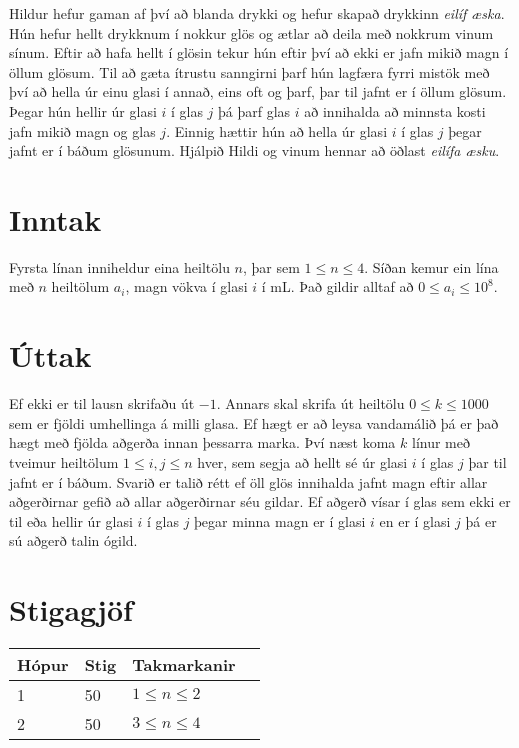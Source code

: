 Hildur hefur gaman af því að blanda drykki og hefur skapað drykkinn \textit{eilíf æska}.
Hún hefur hellt drykknum í nokkur glös og ætlar að deila með nokkrum vinum sínum.
Eftir að hafa hellt í glösin tekur hún eftir því að ekki er jafn mikið magn í öllum glösum.
Til að gæta ítrustu sanngirni þarf hún lagfæra fyrri mistök með því að hella úr einu glasi í annað, eins oft og þarf, þar til jafnt er í öllum glösum.
Þegar hún hellir úr glasi $i$ í glas $j$ þá þarf glas $i$ að innihalda að minnsta kosti jafn mikið magn og glas $j$. Einnig hættir hún að hella úr glasi $i$ í glas $j$ þegar jafnt er í báðum glösunum.
Hjálpið Hildi og vinum hennar að öðlast \textit{eilífa æsku}.

\section*{Inntak}
Fyrsta línan inniheldur eina heiltölu $n$, þar sem $1\leq n\leq 4$.
Síðan kemur ein lína með $n$ heiltölum $a_i$, magn vökva í glasi $i$ í mL. Það gildir alltaf að $0 \leq a_i \leq 10^8$.

\section*{Úttak}
Ef ekki er til lausn skrifaðu út $-1$.
Annars skal skrifa út heiltölu $0 \leq k \leq 1000$ sem er fjöldi umhellinga á milli glasa.
Ef hægt er að leysa vandamálið þá er það hægt með fjölda aðgerða innan þessarra marka.
Því næst koma $k$ línur með tveimur heiltölum $1 \leq i,j \leq n$ hver, sem segja að hellt sé úr glasi $i$ í glas $j$ þar til jafnt er í báðum.
Svarið er talið rétt ef öll glös innihalda jafnt magn eftir allar aðgerðirnar gefið að allar aðgerðirnar séu gildar.
Ef aðgerð vísar í glas sem ekki er til eða hellir úr glasi $i$ í glas $j$ þegar minna magn er í glasi $i$ en er í glasi $j$ þá er sú aðgerð talin ógild.

\section*{Stigagjöf}
\begin{tabular}{|l|l|l|l|}
\hline
Hópur & Stig & Takmarkanir \\ \hline
1     & 50     & $1 \leq n \leq 2$ \\ \hline
2     & 50     & $3 \leq n \leq 4$ \\ \hline
\end{tabular}
